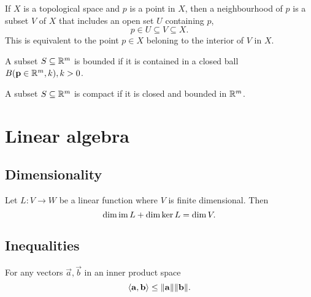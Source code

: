 \documentclass{article}
\begin{document}
\begin{definition}
    If $X$ is a topological space and $p$ is a point in $X$,
    then a neighbourhood of $p$ is a subset $V$ of $X$ that
    includes an open set $U$ containing $p$,
    \begin{equation*}
        p \in U \subseteq V \subseteq X.
    \end{equation*}
    This is equivalent to the point $p \in X$ beloning to the
    interior of $V$ in $X$.
\end{definition}

\begin{definition}
    A subset $S \subseteq \mathbb{R}^m$ is bounded if it is contained in a closed
    ball $B(\mathbf{p} \in \mathbb{R}^m, k), k > 0$.
\end{definition}

\begin{definition}
    A subset $S \subseteq \mathbb{R}^m$ is compact if it is closed and bounded in $\mathbb{R}^m$.
\end{definition}

\section{Linear algebra}

\subsection{Dimensionality}
\begin{theorem}
    Let $L: V \rightarrow W$ be a linear function
    where $V$ is finite dimensional. Then
    \begin{equation}
        \dim \operatorname{im} L + \dim \ker L = \dim V.
    \end{equation}
\end{theorem}
\subsection{Inequalities}


\begin{theorem}
    For any vectors $\vec{a}, \vec{b}$ in an inner product space
    \begin{equation}
        \langle\mathbf{a}, \mathbf{b}\rangle \leq \lVert\mathbf{a}\rVert \lVert\mathbf{b}\rVert.
    \end{equation}
\end{theorem}
\end{document}
